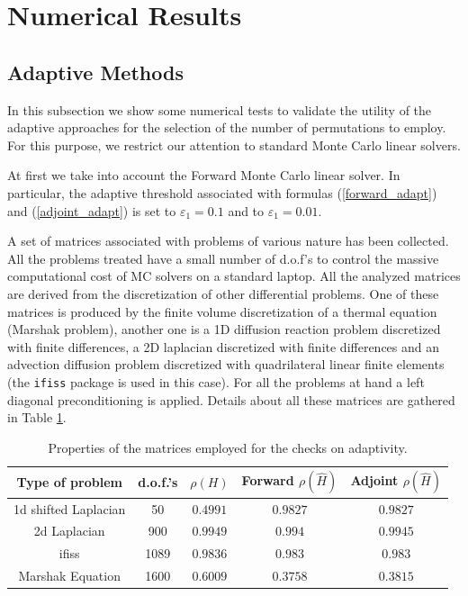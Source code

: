 \section{Numerical Results}

\subsection{Adaptive Methods}

In this subsection we show some numerical tests to validate the utility of the
adaptive approaches for the selection of the number of permutations to employ.
For this purpose, we restrict our attention to standard Monte Carlo linear
solvers.

At first we take into account the Forward Monte Carlo linear solver.
In particular, the adaptive threshold associated with formulas
(\ref{forward_adapt}) and
(\ref{adjoint_adapt}) is set to $\varepsilon_1=0.1$ and to
$\varepsilon_1=0.01$. \newline

A set of matrices associated with problems of various nature has been collected.
All the problems treated have a small number of d.o.f's to control the
massive computational cost of MC solvers on a standard laptop. All the analyzed
matrices are derived from the
discretization of other differential problems.
One of these matrices is produced by the finite volume discretization of
a thermal equation (Marshak problem), another one is a 1D diffusion reaction
problem discretized with finite differences, a
2D laplacian discretized with finite differences and an advection
diffusion
problem discretized with quadrilateral linear finite elements (the
\texttt{ifiss} package is used in this case).
For all the problems at hand a left diagonal preconditioning is applied.
Details about all these matrices are gathered in Table
\ref{table_data}.

\begin{table}[!h]
\centering
\begin{tabular}{|c|c|c|c|c|}
\hline
\textbf{Type of problem} & \textbf{d.o.f.'s} &
$\rho(H)$&Forward $\rho(\hat{H})$&Adjoint $\rho(\hat{H})$\\
\hline
1d shifted Laplacian & 50 & $0.4991$ & $0.9827$ & $0.9827$\\
\hline
2d Laplacian & 900 & $0.9949$ & $0.994$ & $0.9945$\\
\hline
ifiss & 1089 &$0.9836$ & $0.983$ & $0.983$ \\
\hline
Marshak Equation & 1600 & $0.6009$ & $0.3758$ & $ 0.3815$ \\
\hline
\end{tabular}
\caption{Properties of the matrices employed for the checks on adaptivity.}
\label{table_data}
\end{table}

